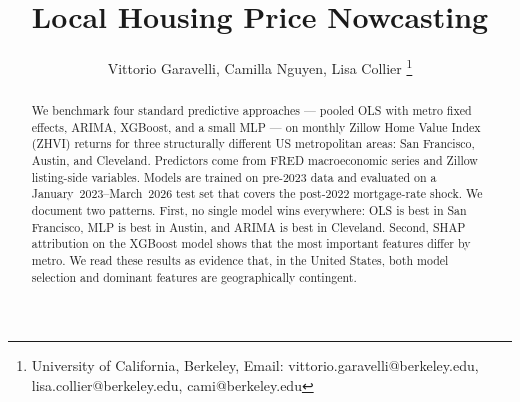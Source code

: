 \documentclass[12pt]{article}
\title{Local Housing Price Nowcasting}
\author{Vittorio Garavelli, Camilla Nguyen, Lisa Collier \thanks{University of California, Berkeley, Email: vittorio.garavelli@berkeley.edu, lisa.collier@berkeley.edu, cami@berkeley.edu}}
\begin{document}
\maketitle
\vspace{-1.5cm}
\begin{abstract}
\noindent We benchmark four standard predictive approaches --- pooled OLS with metro fixed effects, ARIMA, XGBoost, and a small MLP --- on monthly Zillow Home Value Index (ZHVI) returns for three structurally different US metropolitan areas: San Francisco, Austin, and Cleveland. Predictors come from FRED macroeconomic series and Zillow listing-side variables. Models are trained on pre-2023 data and evaluated on a January~2023--March~2026 test set that covers the post-2022 mortgage-rate shock. We document two patterns. First, no single model wins everywhere: OLS is best in San Francisco, MLP is best in Austin, and ARIMA is best in Cleveland. Second, SHAP attribution on the XGBoost model shows that the most important features differ by metro. We read these results as evidence that, in the United States, both model selection and dominant features are geographically contingent.
\end{abstract}









{\footnotesize
{}
\setlength{\bibsep}{2pt}

}
\end{document}
